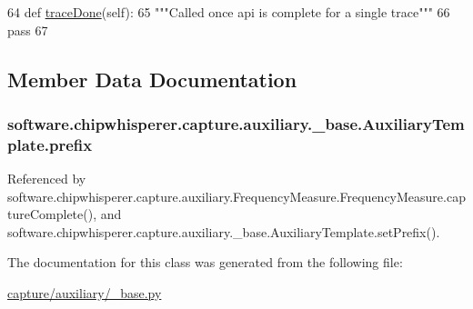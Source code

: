 \begin{DoxyCode}
64     \textcolor{keyword}{def }\hyperlink{classsoftware_1_1chipwhisperer_1_1capture_1_1auxiliary_1_1__base_1_1AuxiliaryTemplate_a3df362298154c3a65eb704068cee23f6}{traceDone}(self):
65         \textcolor{stringliteral}{"""Called once api is complete for a single trace"""}
66         \textcolor{keywordflow}{pass}
67 
\end{DoxyCode}


\subsection{Member Data Documentation}
\hypertarget{classsoftware_1_1chipwhisperer_1_1capture_1_1auxiliary_1_1__base_1_1AuxiliaryTemplate_a6810b1e3125868f572ae5f2b77e4da7e}{}
\subsubsection[{prefix}]{\setlength{\rightskip}{0pt plus 5cm}software.\+chipwhisperer.\+capture.\+auxiliary.\+\_\+base.\+Auxiliary\+Template.\+prefix}\label{classsoftware_1_1chipwhisperer_1_1capture_1_1auxiliary_1_1__base_1_1AuxiliaryTemplate_a6810b1e3125868f572ae5f2b77e4da7e}


Referenced by software.\+chipwhisperer.\+capture.\+auxiliary.\+Frequency\+Measure.\+Frequency\+Measure.\+capture\+Complete(), and software.\+chipwhisperer.\+capture.\+auxiliary.\+\_\+base.\+Auxiliary\+Template.\+set\+Prefix().



The documentation for this class was generated from the following file\+:\begin{DoxyCompactItemize}
\item 
\hyperlink{capture_2auxiliary_2__base_8py}{capture/auxiliary/\+\_\+base.\+py}\end{DoxyCompactItemize}
